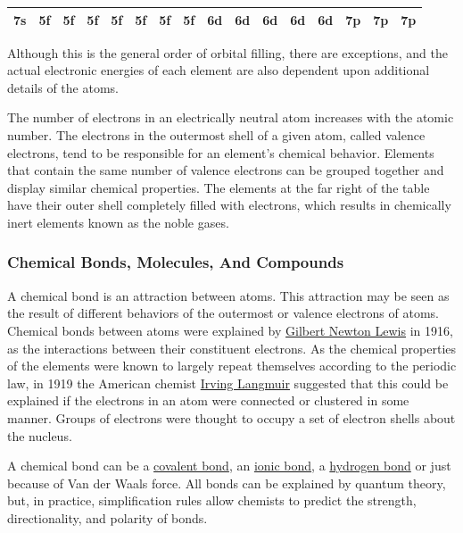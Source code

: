 \begin{table}
\begin{tabular}{@{}llllllllllllllll@{}}
\multicolumn{1}{|l|}{7s} & \multicolumn{1}{l|}{5f} & \multicolumn{1}{l|}{5f} & \multicolumn{1}{l|}{5f} & \multicolumn{1}{l|}{5f} & \multicolumn{1}{l|}{5f} & \multicolumn{1}{l|}{5f} & \multicolumn{1}{l|}{5f} & \multicolumn{1}{l|}{6d} & \multicolumn{1}{l|}{6d} & \multicolumn{1}{l|}{6d} & \multicolumn{1}{l|}{6d} & \multicolumn{1}{l|}{6d} & \multicolumn{1}{l|}{7p} & \multicolumn{1}{l|}{7p} & \multicolumn{1}{l|}{7p} \\ \bottomrule
\end{tabular}
\end{table}
\twocolumn

Although this is the general order of orbital filling, there are
exceptions, and the actual electronic energies of each element are also
dependent upon additional details of the atoms.

The number of electrons in an electrically neutral atom increases with
the atomic number. The electrons in the outermost shell of a given atom,
called valence electrons, tend to be responsible for an element's
chemical behavior. Elements that contain the same number of valence
electrons can be grouped together and display similar chemical
properties. The elements at the far right of the table have their outer
shell completely filled with electrons, which results in chemically
inert elements known as the noble gases.

\hypertarget{chemical-bonds-molecules-and-compounds}{%
\subsubsection{Chemical Bonds, Molecules, And Compounds}\label{chemical-bonds-molecules-and-compounds}}

A chemical bond is an attraction between atoms. This attraction may be
seen as the result of different behaviors of the outermost or valence
electrons of atoms. Chemical bonds between atoms were explained by
\href{https://en.wikipedia.org/wiki/Gilbert_N._Lewis}{Gilbert Newton
Lewis} in 1916, as the interactions between their constituent electrons.
As the chemical properties of the elements were known to largely repeat
themselves according to the periodic law, in 1919 the American chemist
\href{https://en.wikipedia.org/wiki/Irving_Langmuir}{Irving Langmuir}
suggested that this could be explained if the electrons in an atom were
connected or clustered in some manner. Groups of electrons were thought
to occupy a set of electron shells about the nucleus.

A chemical bond can be a
\href{https://en.wikipedia.org/wiki/Covalent_bond}{covalent bond}, an
\href{https://en.wikipedia.org/wiki/Ionic_bonding}{ionic bond}, a
\href{https://en.wikipedia.org/wiki/Hydrogen_bond}{hydrogen bond} or
just because of Van der Waals force. All bonds can be explained by
quantum theory, but, in practice, simplification rules allow chemists to
predict the strength, directionality, and polarity of bonds.

